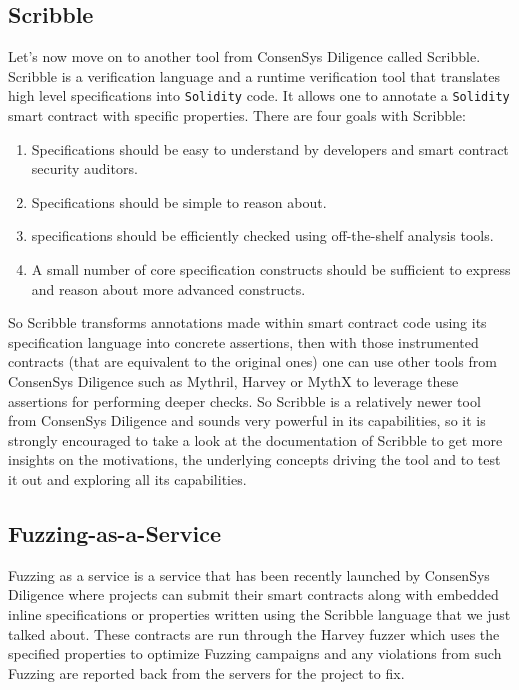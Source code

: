 \subsection{Scribble}\label{scribble}

Let's now move on to another tool from ConsenSys Diligence called
Scribble. Scribble is a verification language and a runtime verification
tool that translates high level specifications into \texttt{Solidity}
code. It allows one to annotate a \texttt{Solidity} smart contract with
specific properties. There are four goals with Scribble:

\begin{enumerate}
\def\labelenumi{\arabic{enumi}.}
\tightlist
\item
  Specifications should be easy to understand by developers and smart
  contract security auditors.
\item
  Specifications should be simple to reason about.
\item
  specifications should be efficiently checked using off-the-shelf
  analysis tools.
\item
  A small number of core specification constructs should be sufficient
  to express and reason about more advanced constructs.
\end{enumerate}

So Scribble transforms annotations made within smart contract code using
its specification language into concrete assertions, then with those
instrumented contracts (that are equivalent to the original ones) one
can use other tools from ConsenSys Diligence such as Mythril, Harvey or
MythX to leverage these assertions for performing deeper checks. So
Scribble is a relatively newer tool from ConsenSys Diligence and sounds
very powerful in its capabilities, so it is strongly encouraged to take
a look at the documentation of Scribble to get more insights on the
motivations, the underlying concepts driving the tool and to test it out
and exploring all its capabilities.

\subsection{Fuzzing-as-a-Service}\label{fuzzing-as-a-service}

Fuzzing as a service is a service that has been recently launched by
ConsenSys Diligence where projects can submit their smart contracts
along with embedded inline specifications or properties written using
the Scribble language that we just talked about. These contracts are run
through the Harvey fuzzer which uses the specified properties to
optimize Fuzzing campaigns and any violations from such Fuzzing are
reported back from the servers for the project to fix.

